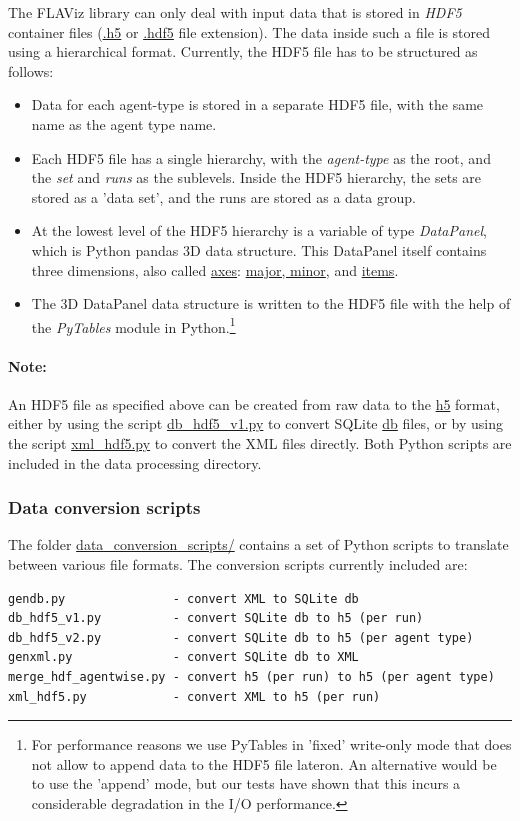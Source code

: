 \documentclass[10pt,a4paper]{article}
\begin{document}
The FLAViz library can only deal with input data that is stored in \emph{HDF5} container files (\url{.h5} or \url{.hdf5} file extension). The data inside such a file is stored using a hierarchical format. Currently, the HDF5 file has to be structured as follows:
\begin{itemize}
\item Data for each agent-type is stored in a separate HDF5 file, with the same name as the agent type name.

\item Each HDF5 file has a single hierarchy, with the \emph{agent-type} as the root, and the \emph{set} and \emph{runs} as the sublevels. Inside the HDF5 hierarchy, the sets are stored as a 'data set', and the runs are stored as a data group.

\item At the lowest level of the HDF5 hierarchy is a variable of type \emph{DataPanel}, which is Python pandas 3D data structure. This DataPanel itself contains three dimensions, also called \url{axes}: \url{major, minor}, and \url{items}.

\item The 3D DataPanel data structure is written to the HDF5 file with the help of the \emph{PyTables} module in Python.\footnote{For performance reasons we use PyTables in 'fixed' write-only mode that does not allow to append data to the HDF5 file lateron. An alternative would be to use the 'append' mode, but our tests have shown that this incurs a considerable degradation in the I/O performance.}
\end{itemize}

\paragraph{Note:} An HDF5 file as specified above can be created from raw data to the \url{h5} format, either by using the script \url{db_hdf5_v1.py} to convert SQLite \url{db} files, or by using the script \url{xml_hdf5.py} to convert the XML files directly. Both Python scripts are included in the data processing directory.

\subsubsection{Data conversion scripts}

The folder \url{data_conversion_scripts/} contains a set of Python scripts to translate between various file formats.
The conversion scripts currently included are:
\begin{verbatim}
gendb.py               - convert XML to SQLite db
db_hdf5_v1.py          - convert SQLite db to h5 (per run)
db_hdf5_v2.py          - convert SQLite db to h5 (per agent type)
genxml.py              - convert SQLite db to XML
merge_hdf_agentwise.py - convert h5 (per run) to h5 (per agent type)
xml_hdf5.py            - convert XML to h5 (per run)
\end{verbatim}
\end{document}
